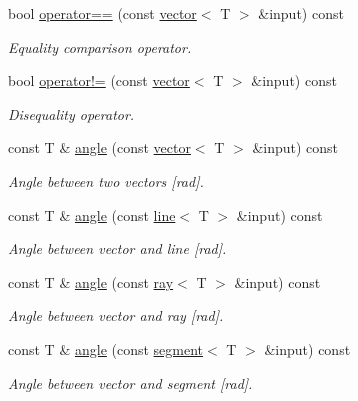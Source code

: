 \begin{DoxyCompactItemize}
bool \hyperlink{classddd_1_1vector_a7595b24534ba95d03d9ace253a7c355f}{operator==} (const \hyperlink{classddd_1_1vector}{vector}$<$ T $>$ \&input) const
\begin{DoxyCompactList}\small\item\em Equality comparison operator. \end{DoxyCompactList}\item 
bool \hyperlink{classddd_1_1vector_a8c18336941576daaff53568d424a27bd}{operator!=} (const \hyperlink{classddd_1_1vector}{vector}$<$ T $>$ \&input) const
\begin{DoxyCompactList}\small\item\em Disequality operator. \end{DoxyCompactList}\item 
const T \& \hyperlink{classddd_1_1vector_ad1a37ce1d1c20c227257fd1fd223c3cf}{angle} (const \hyperlink{classddd_1_1vector}{vector}$<$ T $>$ \&input) const
\begin{DoxyCompactList}\small\item\em Angle between two vectors \mbox{[}rad\mbox{]}. \end{DoxyCompactList}\item 
const T \& \hyperlink{classddd_1_1vector_a97a1359914c22ea1e3928f02fc650bac}{angle} (const \hyperlink{classddd_1_1line}{line}$<$ T $>$ \&input) const
\begin{DoxyCompactList}\small\item\em Angle between vector and line \mbox{[}rad\mbox{]}. \end{DoxyCompactList}\item 
const T \& \hyperlink{classddd_1_1vector_a893bfd1b0209a0a7e7630a3ddf38193d}{angle} (const \hyperlink{classddd_1_1ray}{ray}$<$ T $>$ \&input) const
\begin{DoxyCompactList}\small\item\em Angle between vector and ray \mbox{[}rad\mbox{]}. \end{DoxyCompactList}\item 
const T \& \hyperlink{classddd_1_1vector_aa1d50d563f55d5795d565ed70ec5b845}{angle} (const \hyperlink{classddd_1_1segment}{segment}$<$ T $>$ \&input) const
\begin{DoxyCompactList}\small\item\em Angle between vector and segment \mbox{[}rad\mbox{]}. \end{DoxyCompactList}\item 
\mbox{\label{classddd_1_1row_object_a1da634f01207c96a25d5d53a74619afe}} 

\end{DoxyCompactItemize}
